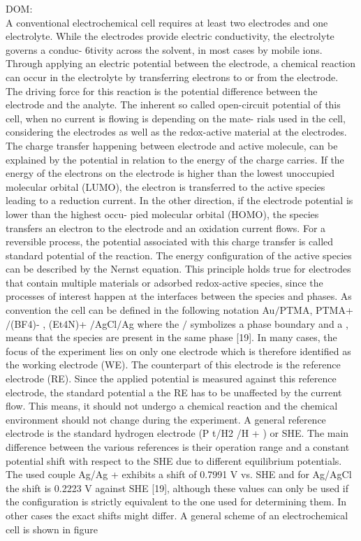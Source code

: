 DOM:\\
A conventional electrochemical cell requires at least two electrodes and one electrolyte.
While the electrodes provide electric conductivity, the electrolyte governs a conduc-
6tivity across the solvent, in most cases by mobile ions. Through applying an electric
potential between the electrode, a chemical reaction can occur in the electrolyte by
transferring electrons to or from the electrode. The driving force for this reaction is
the potential difference between the electrode and the analyte. The inherent so called
open-circuit potential of this cell, when no current is flowing is depending on the mate-
rials used in the cell, considering the electrodes as well as the redox-active material at
the electrodes. The charge transfer happening between electrode and active molecule,
can be explained by the potential in relation to the energy of the charge carries. If the
energy of the electrons on the electrode is higher than the lowest unoccupied molecular
orbital (LUMO), the electron is transferred to the active species leading to a reduction
current. In the other direction, if the electrode potential is lower than the highest occu-
pied molecular orbital (HOMO), the species transfers an electron to the electrode and
an oxidation current flows. For a reversible process, the potential associated with this
charge transfer is called standard potential of the reaction. The energy configuration
of the active species can be described by the Nernst equation.
This principle holds true for electrodes that contain multiple materials or adsorbed
redox-active species, since the processes of interest happen at the interfaces between
the species and phases. As convention the cell can be defined in the following notation
Au$/$PTMA, PTMA+ $/$(BF4)- , (Et4N)+ $/$AgCl$/$Ag
where the $/$ symbolizes a phase boundary and a , means that the species are present
in the same phase [19].
In many cases, the focus of the experiment lies on only one electrode which is therefore
identified as the working electrode (WE). The counterpart of this electrode is the
reference electrode (RE). Since the applied potential is measured against this reference
electrode, the standard potential a the RE has to be unaffected by the current flow.
This means, it should not undergo a chemical reaction and the chemical environment
should not change during the experiment. A general reference electrode is the standard
hydrogen electrode (P t/H2 /H + ) or SHE. The main difference between the various
references is their operation range and a constant potential shift with respect to the
SHE due to different equilibrium potentials. The used couple Ag/Ag + exhibits a shift
of 0.7991 V vs. SHE and for Ag/AgCl the shift is 0.2223 V against SHE [19], although
these values can only be used if the configuration is strictly equivalent to the one used
for determining them. In other cases the exact shifts might differ. A general scheme
of an electrochemical cell is shown in figure



